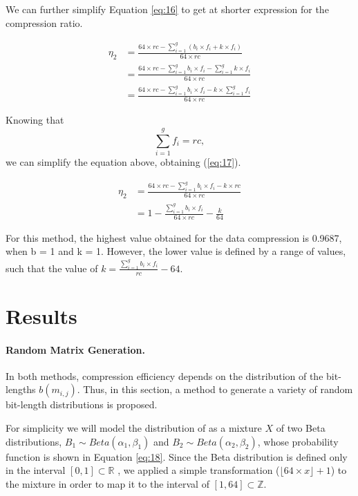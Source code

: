 \documentclass[10pt]{article}
\begin{document}
We can further simplify Equation \ref{eq:16} to get at shorter expression for 
the compression ratio. 

\begin{align}
 \eta_2 &= \frac{64 \times rc - \sum_{i=1}^{g} ( b_i \times f_i + k \times f_i )}{64 \times rc} \nonumber \\
  &= \frac{64 \times rc - \sum_{i=1}^{g}  b_i \times f_i  -\sum_{i=1}^{g}  k \times f_i }{64 \times rc}\nonumber \\
  &= \frac{64 \times rc - \sum_{i=1}^{g}  b_i \times f_i  - k \times\sum_{i=1}^{g}  f_i }{64 \times rc}\nonumber 
\end{align}
  
 Knowing that $$\sum_{i=1}^{g} f_i = rc, $$ we can simplify the equation above, 
obtaining (\ref{eq:17}). 
 
\begin{align}\label{eq:17}
 \eta_2 &= \frac{64 \times rc - \sum_{i=1}^{g}  b_i \times f_i  - k \times rc }{64 \times rc}\nonumber \\
  &= 1 - \frac{\sum_{i=1}^{g}  b_i \times f_i }{64 \times rc} - \frac{k}{64}
\end{align}

For this method, the highest value obtained for the data compression is 0.9687, 
when b = 1 and k = 1. However, the lower value is defined by a range of values, 
​​such that the value of $k = \frac{\sum_{i=1}^{g}  b_i \times f_i}{rc} - 64$. 

\section*{Results}

\paragraph{Random Matrix Generation.}
In both methods, compression efficiency depends on the distribution of the 
bit-lengths $b(m_{i,j})$. Thus, in this section, a method to generate a variety 
of random bit-length distributions is proposed. 

For simplicity we will model the distribution of as a mixture $X$ of two Beta 
distributions, $B_1 \sim Beta(\alpha_1,\beta_1)$ and $B_2 \sim 
Beta(\alpha_2,\beta_2)$, whose probability function is shown in Equation 
\ref{eq:18}. Since the Beta distribution is defined only in the interval $[0,1] 
\subset \mathbb{R}$ , we applied a simple transformation ($\lfloor 64 \times x 
\rfloor + 1$) to the mixture in order to map it to the interval of $[1,64] 
\subset \mathbb{Z}$. 
\end{document}
